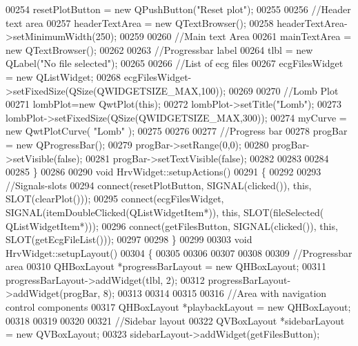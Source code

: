 \begin{DoxyCode}
{{{00254     resetPlotButton = \textcolor{keyword}{new} QPushButton(\textcolor{stringliteral}{"Reset plot"});
00255 
00256     \textcolor{comment}{//Header text area}
00257     headerTextArea = \textcolor{keyword}{new} QTextBrowser();
00258     headerTextArea->setMinimumWidth(250);
00259 
00260     \textcolor{comment}{//Main text Area}
00261     mainTextArea = \textcolor{keyword}{new} QTextBrowser();
00262 
00263     \textcolor{comment}{//Progressbar label}
00264     tlbl = \textcolor{keyword}{new} QLabel(\textcolor{stringliteral}{"No file selected"});
00265 
00266     \textcolor{comment}{//List of ecg files}
00267     ecgFilesWidget = \textcolor{keyword}{new} QListWidget;
00268     ecgFilesWidget->setFixedSize(QSize(QWIDGETSIZE\_MAX,100));
00269 
00270     \textcolor{comment}{//Lomb Plot}
00271     lombPlot=\textcolor{keyword}{new} QwtPlot(\textcolor{keyword}{this});
00272     lombPlot->setTitle(\textcolor{stringliteral}{"Lomb"});
00273     lombPlot->setFixedSize(QSize(QWIDGETSIZE\_MAX,300));
00274     myCurve = \textcolor{keyword}{new} QwtPlotCurve( \textcolor{stringliteral}{"Lomb"} );
00275 
00276 
00277     \textcolor{comment}{//Progress bar}
00278     progBar = \textcolor{keyword}{new} QProgressBar();
00279     progBar->setRange(0,0);
00280     progBar->setVisible(\textcolor{keyword}{false});
00281     progBar->setTextVisible(\textcolor{keyword}{false});
00282 
00283 
00284 
00285 \}
00286 
00290 \textcolor{keywordtype}{void} HrvWidget::setupActions()
00291 \{
00292 
00293     \textcolor{comment}{//Signals-slots}
00294     connect(resetPlotButton, SIGNAL(clicked()), \textcolor{keyword}{this}, SLOT(clearPlot()));
00295     connect(ecgFilesWidget, SIGNAL(itemDoubleClicked(QListWidgetItem*)), \textcolor{keyword}{this}, SLOT(fileSelected(
      QListWidgetItem*)));
00296     connect(getFilesButton, SIGNAL(clicked()), \textcolor{keyword}{this}, SLOT(getEcgFileList()));
00297 
00298 \}
00299 
00303 \textcolor{keywordtype}{void} HrvWidget::setupLayout()
00304 \{
00305 
00306 
00307 
00308 
00309     \textcolor{comment}{//Progressbar area}
00310     QHBoxLayout *progressBarLayout = \textcolor{keyword}{new} QHBoxLayout;
00311     progressBarLayout->addWidget(tlbl, 2);
00312     progressBarLayout->addWidget(progBar, 8);
00313 
00314 
00315 
00316     \textcolor{comment}{//Area with navigation control components}
00317     QHBoxLayout *playbackLayout = \textcolor{keyword}{new} QHBoxLayout;
00318 
00319 
00320 
00321     \textcolor{comment}{//Sidebar layout}
00322     QVBoxLayout *sidebarLayout = \textcolor{keyword}{new} QVBoxLayout;
00323     sidebarLayout->addWidget(getFilesButton);
}}}
\end{DoxyCode}
